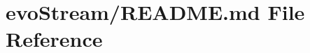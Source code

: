 \hypertarget{evoStream_2README_8md}{}\section{evo\+Stream/\+R\+E\+A\+D\+ME.md File Reference}
\label{evoStream_2README_8md}
